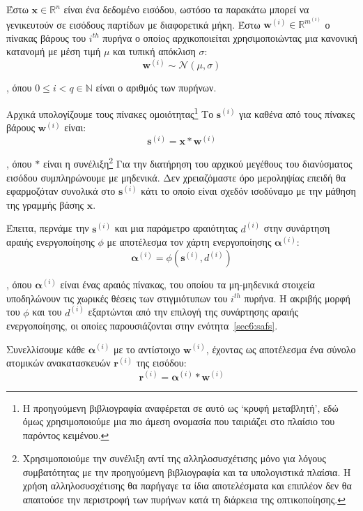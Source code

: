 Έστω $\bm{x} \in \mathbb{R}^n$ είναι ένα δεδομένο εισόδου, ωστόσο τα παρακάτω μπορεί να γενικευτούν σε εισόδους παρτίδων με διαφορετικά μήκη.
Έστω $\bm{w}^{(i)} \in \mathbb{R}^{m^{(i)}}$ ο πίνακας βάρους του $i^{th}$ πυρήνα ο οποίος αρχικοποιείται χρησιμοποιώντας μια κανονική κατανομή με μέση τιμή $\mu$ και τυπική απόκλιση $\sigma$:
\begin{equation}
	\label{eq:weightinitialization}
	\bm{w}^{(i)} \sim \mathcal{N}(\mu, \sigma)
\end{equation}

\noindent
, όπου $0 \le i <q \in \mathbb{N}$ είναι ο αριθμός των πυρήνων.

Αρχικά υπολογίζουμε τους πίνακες ομοιότητας\footnote{Η προηγούμενη βιβλιογραφία αναφέρεται σε αυτό ως `κρυφή μεταβλητή', εδώ όμως χρησιμοποιούμε μια πιο άμεση ονομασία που ταιριάζει στο πλαίσιο του παρόντος κειμένου.} Το $\bm{s}^{(i)}$ για καθένα από τους πίνακες βάρους $\bm{w}^{(i)}$ είναι:
\begin{equation}
	\label{eq:similarity}
	\bm{s}^{(i)} = \bm{x} * \bm{w}^{(i)}
\end{equation}

\noindent
, όπου $*$ είναι η συνέλιξη\footnote{Χρησιμοποιούμε την συνέλιξη αντί της αλληλοσυσχέτισης μόνο για λόγους συμβατότητας με την προηγούμενη βιβλιογραφία και τα υπολογιστικά πλαίσια. Η χρήση αλληλοσυσχέτισης θα παρήγαγε τα ίδια αποτελέσματα και επιπλέον δεν θα απαιτούσε την περιστροφή των πυρήνων κατά τη διάρκεια της οπτικοποίησης.}
Για την διατήρηση του αρχικού μεγέθους του διανύσματος εισόδου συμπληρώνουμε με μηδενικά.
Δεν χρειαζόμαστε όρο μεροληψίας επειδή θα εφαρμοζόταν συνολικά στο $\bm{s}^{(i)}$ κάτι το οποίο είναι σχεδόν ισοδύναμο με την μάθηση της γραμμής βάσης $\bm{x}$.

Έπειτα, περνάμε την $\bm{s}^{(i)}$ και μια παράμετρο αραιότητας $d^{(i)}$ στην συνάρτηση αραιής ενεργοποίησης $\phi$ με αποτέλεσμα τον χάρτη ενεργοποίησης $\bm{\alpha}^{(i)}$:
\begin{equation}
	\label{eq:extrema}
	\bm{\alpha}^{(i)} = \phi(\bm{s}^{(i)}, d^{(i)})
\end{equation}

\noindent
, όπου $\bm{\alpha}^{(i)}$ είναι ένας αραιός πίνακας, του οποίου τα μη-μηδενικά στοιχεία υποδηλώνουν τις χωρικές θέσεις των στιγμιότυπων του $i^{th}$ πυρήνα.
Η ακριβής μορφή του $\phi$ και του $d^{(i)}$ εξαρτώνται από την επιλογή της συνάρτησης αραιής ενεργοποίησης, οι οποίες παρουσιάζονται στην ενότητα~\ref{sec6:safs}.

Συνελλίσουμε κάθε $\bm{\alpha}^{(i)}$ με το αντίστοιχο $\bm{w}^{(i)}$, έχοντας ως αποτέλεσμα ένα σύνολο ατομικών ανακατασκευών $\bm{r}^{(i)}$ της εισόδου:
\begin{equation}
	\label{eq:reconstructions}
	\bm{r}^{(i)} = \bm{\alpha}^{(i)} * \bm{w}^{(i)}
\end{equation}

